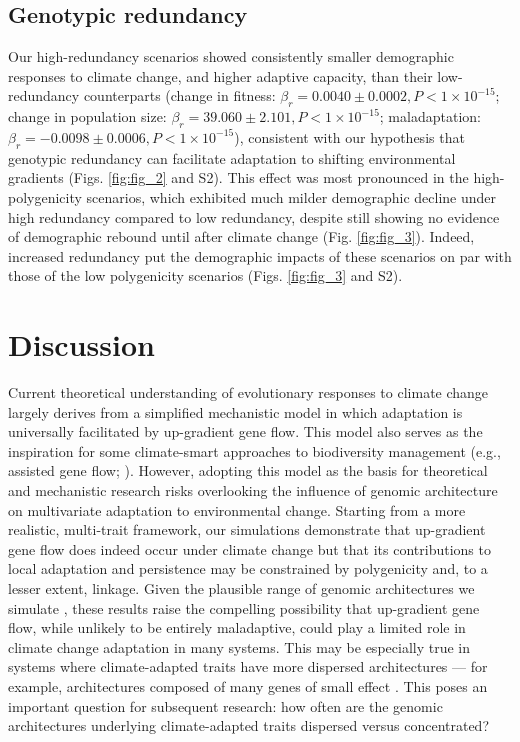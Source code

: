 \documentclass[9pt,twocolumn,twoside,lineno]{new_article}
\begin{document}
\subsection*{Genotypic redundancy}
Our high-redundancy scenarios showed
consistently smaller demographic responses to climate change, and higher adaptive capacity,
than their low-redundancy counterparts 
(change in fitness: $\beta_{r} = 0.0040\pm0.0002, P<1\times10^{-15}$;
change in population size: $\beta_{r} = 39.060\pm2.101, P<1\times10^{-15}$;
maladaptation: $\beta_{r} = -0.0098\pm0.0006, P<1\times10^{-15}$), consistent with our hypothesis that
genotypic redundancy can facilitate adaptation to shifting environmental gradients (Figs. \ref{fig:fig_2} and S2).
This effect was most pronounced in the high-polygenicity scenarios,
which exhibited much milder demographic decline under high redundancy compared to low redundancy,
despite still showing no evidence of demographic rebound until after climate change (Fig. \ref{fig:fig_3}).
Indeed, increased redundancy put the demographic
impacts of these scenarios on par with those
of the low polygenicity scenarios (Figs. \ref{fig:fig_3} and S2).


\section*{Discussion}

Current theoretical understanding of evolutionary responses to climate change
largely derives from a simplified mechanistic model in which
adaptation is universally facilitated by up-gradient gene flow.
This model also serves as the inspiration for some climate-smart
approaches to biodiversity management
(e.g., assisted gene flow; \cite{aitken_whitlock}).
However, adopting this model as the basis
for theoretical and mechanistic research
risks overlooking the influence of
genomic architecture on multivariate adaptation to environmental change.
Starting from a more realistic, multi-trait framework,
our simulations demonstrate that up-gradient gene flow does indeed
occur under climate change
but that its contributions to local adaptation and persistence may be constrained
by polygenicity and, to a lesser extent, linkage.
Given the plausible range of genomic architectures we simulate
\cite{barghi_polygenic,boyle,rockman,savolainen,sella,bomblies},
these results raise the compelling
possibility that up-gradient gene flow, while unlikely
to be entirely maladaptive, could play a limited role in
climate change adaptation in many systems.
This may be especially true in systems where climate-adapted traits
have more dispersed architectures --- for example, architectures composed of many genes of small effect \cite{yeaman_review}.
This poses an important question for subsequent research:
how often are the genomic architectures underlying climate-adapted traits dispersed
versus concentrated?
\end{document}
